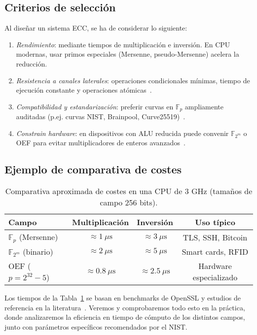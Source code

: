 \subsection*{Criterios de selección}
Al diseñar un sistema ECC, se ha de considerar lo siguiente:
\begin{enumerate}
  \item \emph{Rendimiento}: mediante tiempos de multiplicación e inversión. En CPU modernas, usar primos especiales (Mersenne, pseudo-Mersenne) acelera la reducción\citep{10.1007/11745853_14}.
  \item \emph{Resistencia a canales laterales}: operaciones condicionales mínimas, tiempo de ejecución constante y operaciones atómicas~\citep{kocher-sca}.
  \item \emph{Compatibilidad y estandarización}: preferir curvas en \(\mathbb{F}_p\) ampliamente auditadas (p.ej. curvas NIST, Brainpool, Curve25519)~\citep{cfrg-curves}.
  \item \emph{Constrain hardware}: en dispositivos con ALU reducida puede convenir \(\mathbb{F}_{2^m}\) o OEF para evitar multiplicadores de enteros avanzados~\citep{militzer-oef}.
\end{enumerate}

\subsection*{Ejemplo de comparativa de costes}

\begin{table}[H]
  \centering
  \begin{tabular}{lccc}
    \hline
    \textbf{Campo} & \textbf{Multiplicación} & \textbf{Inversión} & \textbf{Uso típico} \\
    \hline
    \(\mathbb{F}_p\) (Mersenne) & \(\approx1\ \mu\mathrm{s}\) & \(\approx3\ \mu\mathrm{s}\) & TLS, SSH, Bitcoin \\
    \(\mathbb{F}_{2^m}\) (binario) & \(\approx2\ \mu\mathrm{s}\) & \(\approx5\ \mu\mathrm{s}\) & Smart cards, RFID \\
    OEF (\(p=2^{32}-5\))          & \(\approx0.8\ \mu\mathrm{s}\)& \(\approx2.5\ \mu\mathrm{s}\)& Hardware especializado\\
    \hline
  \end{tabular}
  \caption{Comparativa aproximada de costes en una CPU de 3 GHz (tamaños de campo 256 bits).}
  \label{tab:comparativa_campos}
\end{table}

Los tiempos de la Tabla~\ref{tab:comparativa_campos} se basan en benchmarks de OpenSSL y estudios de referencia en la literatura~\citep{openssl-bench,hankerson2004}. Veremos y comprobaremos todo esto en la práctica, donde analizaremos la eficiencia en tiempo de cómputo de los distintos campos, junto con parámetros específicos recomendados por el NIST.
